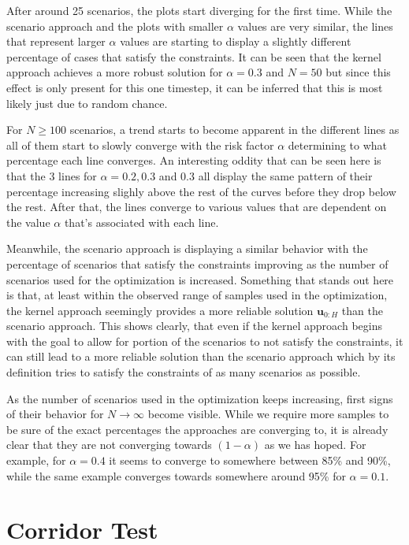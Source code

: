 After around 25 scenarios, the plots start diverging for the first time. While the scenario approach and the plots with smaller $\alpha$ values are very similar, the lines that represent larger $\alpha$ values are starting to display a slightly different percentage of cases that satisfy the constraints. It can be seen that the kernel approach achieves a more robust solution for $\alpha = 0.3$ and $N = 50$ but since this effect is only present for this one timestep, it can be inferred that this is most likely just due to random chance.

For $N \geq 100$ scenarios, a trend starts to become apparent in the different lines as all of them start to slowly converge with the risk factor $\alpha$ determining to what percentage each line converges. An interesting oddity that can be seen here is that the 3 lines for $\alpha = 0.2, 0.3$ and $0.3$ all display the same pattern of their percentage increasing slighly above the rest of the curves before they drop below the rest. After that, the lines converge to various values that are dependent on the value $\alpha$ that's associated with each line.

Meanwhile, the scenario approach is displaying a similar behavior with the percentage of scenarios that satisfy the constraints improving as the number of scenarios used for the optimization is increased. Something that stands out here is that, at least within the observed range of samples used in the optimization, the kernel approach seemingly provides a more reliable solution $\boldsymbol{u}_{0:H}$ than the scenario approach. This shows clearly, that even if the kernel approach begins with the goal to allow for portion of the scenarios to not satisfy the constraints, it can still lead to a more reliable solution than the scenario approach which by its definition tries to satisfy the constraints of as many scenarios as possible.

As the number of scenarios used in the optimization keeps increasing, first signs of their behavior for $N \to \infty$ become visible. While we require more samples to be sure of the exact percentages the approaches are converging to, it is already clear that they are not converging towards $(1 - \alpha)$ as we has hoped. For example, for $\alpha = 0.4$ it seems to converge to somewhere between 85\% and 90\%, while the same example converges towards somewhere around 95\% for $\alpha = 0.1$.
 
\section{Corridor Test} \label{corridor}

